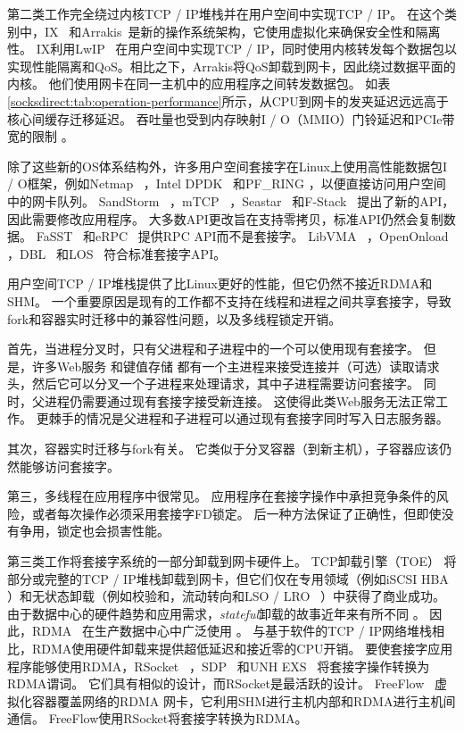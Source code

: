 第二类工作完全绕过内核TCP / IP堆栈并在用户空间中实现TCP / IP。
在这个类别中，IX~ \cite {belay2017ix}和Arrakis~\cite {peter2016arrakis}是新的操作系统架构，它使用虚拟化来确保安全性和隔离性。 IX利用LwIP~ \cite {dunkels2001design}在用户空间中实现TCP / IP，同时使用内核转发每个数据包以实现性能隔离和QoS。相比之下，Arrakis将QoS卸载到网卡，因此绕过数据平面的内核。
他们使用网卡在同一主机中的应用程序之间转发数据包。
如表 \ref {socksdirect:tab:operation-performance}所示，从CPU到网卡的发夹延迟远远高于核心间缓存迁移延迟。
吞吐量也受到内存映射I / O（MMIO）门铃延迟和PCIe带宽的限制 \cite {neugebauer2018understanding,li2017kv}。

除了这些新的OS体系结构外，许多用户空间套接字在Linux上使用高性能数据包I / O框架，例如Netmap~ \cite {rizzo2012netmap}，Intel DPDK~ \cite {dpdk}和PF\_RING \cite {pf-ring}，以便直接访问用户空间中的网卡队列。
SandStorm~ \cite {marinos2014network}，mTCP~ \cite {jeong2014mtcp}，Seastar~ \cite {seastar}和F-Stack~ \cite {fstack}提出了新的API，因此需要修改应用程序。
大多数API更改旨在支持零拷贝，标准API仍然会复制数据。
FaSST~ \cite {kalia2016fasst}和eRPC~ \cite {kalia2018datacenter}提供RPC API而不是套接字。
LibVMA~ \cite {libvma}，OpenOnload~ \cite {openonload}，DBL~ \cite {dbl}和LOS~ \cite {huang2017high}符合标准套接字API。

用户空间TCP / IP堆栈提供了比Linux更好的性能，但它仍然不接近RDMA和SHM。
一个重要原因是现有的工作都不支持在线程和进程之间共享套接字，导致fork和容器实时迁移中的兼容性问题，以及多线程锁定开销。

首先，当进程分叉时，只有父进程和子进程中的一个可以使用现有套接字。
但是，许多Web服务 \cite {apache,nginx,php-fpm,python-gunicorn,vsftpd}和键值存储 \cite {memcached}都有一个主进程来接受连接并（可选）读取请求头，然后它可以分叉一个子进程来处理请求，其中子进程需要访问套接字。
同时，父进程仍需要通过现有套接字接受新连接。
这使得此类Web服务无法正常工作。
更棘手的情况是父进程和子进程可以通过现有套接字同时写入日志服务器。

其次，容器实时迁移与fork有关。
它类似于分叉容器（到新主机），子容器应该仍然能够访问套接字。

第三，多线程在应用程序中很常见。
应用程序在套接字操作中承担竞争条件的风险，或者每次操作必须采用套接字FD锁定。
后一种方法保证了正确性，但即使没有争用，锁定也会损害性能。

第三类工作将套接字系统的一部分卸载到网卡硬件上。
TCP卸载引擎（TOE） \cite {tcp-chimney-offload}将部分或完整的TCP / IP堆栈卸载到网卡，但它们仅在专用领域（例如iSCSI HBA~ \cite {iscsi-hba}）和无状态卸载（例如校验和，流动转向和LSO / LRO~ \cite {lsolro}）中获得了商业成功。
由于数据中心的硬件趋势和应用需求，\emph {stateful}卸载的故事近年来有所不同 \cite {chuanxiong-rdma-keynote}。
因此，RDMA~ \cite {infiniband2000infiniband}在生产数据中心中广泛使用 \cite {guo2016rdma}。
与基于软件的TCP / IP网络堆栈相比，RDMA使用硬件卸载来提供超低延迟和接近零的CPU开销。
要使套接字应用程序能够使用RDMA，RSocket~ \cite {rsockets}，SDP~ \cite {socketsdirect}和UNH EXS~ \cite {russell2008extended}将套接字操作转换为RDMA谓词。
它们具有相似的设计，而RSocket是最活跃的设计。
FreeFlow~ \cite {nsdi19freeflow}虚拟化容器覆盖网络的RDMA 网卡，它利用SHM进行主机内部和RDMA进行主机间通信。
FreeFlow使用RSocket将套接字转换为RDMA。

